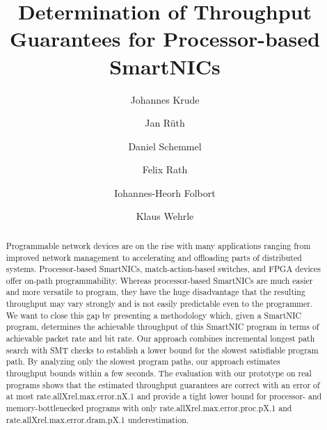 \documentclass[10pt,letterpaper,sigconf,anonymous,nonacm,screen]{acmart}
\newcommand{\mdata}[3]{%
	\csname #1X#2X#3\endcsname%
}
\begin{document}
\title{Determination of Throughput Guarantees for Processor-based SmartNICs}

\author{Johannes Krude}
\affiliation{%
	\institution{RWTH Aachen University}
	\country{}%
}

\author{Jan Rüth}
\affiliation{%
	\institution{RWTH Aachen University}
	\country{}%
}

\author{Daniel Schemmel}
\affiliation{%
	\institution{RWTH Aachen University}
	\country{}%
}

\author{Felix Rath}
\affiliation{%
	\institution{RWTH Aachen University}
	\country{}%
}

\author{Iohannes-Heorh Folbort}
\affiliation{%
	\institution{RWTH Aachen University}
	\country{}%
}

\author{Klaus Wehrle}
\affiliation{%
	\institution{RWTH Aachen University}
	\country{}%
}

\renewcommand{\shortauthors}{Krude, et al.}

\begin{abstract}
Programmable network devices are on the rise with many applications ranging from improved network management to accelerating and offloading parts of distributed systems.
Processor-based SmartNICs, match-action-based switches, and FPGA devices offer on-path programmability.
Whereas processor-based SmartNICs are much easier and more versatile to program, they have the huge disadvantage that the resulting throughput may vary strongly and is not easily predictable even to the programmer.
We want to close this gap by presenting a methodology which, given a SmartNIC program, determines the achievable throughput of this SmartNIC program in terms of achievable packet rate and bit rate.
Our approach combines incremental longest path search with \acs{SMT} checks to establish a lower bound for the slowest satisfiable program path.
By analyzing only the slowest program paths, our approach estimates throughput bounds within a few seconds.
The evaluation with our prototype on real programs shows that the estimated throughput guarantees are correct with an error of at most \mdata{rate.all}{rel.max.error.n}{.1} and provide a tight lower bound for processor- and memory-bottlenecked programs with only \mdata{rate.all}{rel.max.error.proc.p}{.1} and \mdata{rate.all}{rel.max.error.dram.p}{.1} underestimation.
\end{abstract}
\end{document}
